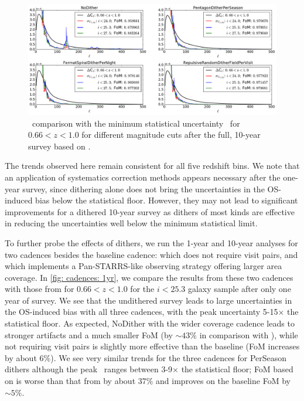 \begin{figure}[!htb]
      \centering\hspace*{1em}\includegraphics[width=\linewidth]{figs/awan_10yr_minion1016_3magCuts.pdf}
       \vspace*{-2em}
\caption{\sigmaOS\ comparison with the minimum statistical uncertainty \statFloor\ for $0.66<z<1.0$ for different magnitude cuts after the full, 10-year survey based on .}
\label{fig: minion1016: 10yr}
\end{figure}

The trends observed here remain consistent for all five redshift bins. We note that an application of systematics correction methods appears necessary after the one-year survey, since dithering alone does not bring the uncertainties in the OS-induced bias below the statistical floor. However, they may not lead to significant improvements for a dithered 10-year survey as dithers of most kinds are effective in reducing the uncertainties well below the minimum statistical limit.

To further probe the effects of dithers, we run the 1-year and 10-year analyses for two cadences besides the baseline cadence:  which does not require visit pairs, and  which implements a Pan-STARRS-like observing strategy offering larger area coverage. In \autoref{fig: cadences: 1yr}, we compare the results from these two cadences with those from  for $0.66<z<1.0$ for the  $i<25.3$ galaxy sample after only one year of survey. We see that the undithered survey leads to large uncertainties in the OS-induced bias with all three cadences, with the peak uncertainty 5-15$\times$ the statistical floor. As expected, NoDither with the wider coverage  cadence leads to stronger artifacts and a much smaller FoM (by $\sim43\%$ in comparison with ), while not requiring visit pairs is slightly more effective than the baseline (FoM increases by about 6$\%$). We see very similar trends for the three cadences for PerSeason dithers although the peak \sigmaOS\ ranges between 3-9$\times$ the statistical floor; FoM based on  is worse than that from  by about 37$\%$ and   improves on the baseline FoM by $\sim5\%$.

